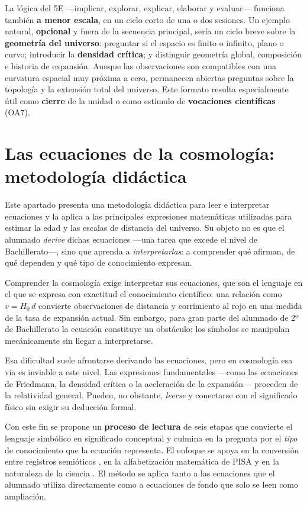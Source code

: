 La lógica del 5E ---implicar, explorar, explicar, elaborar y evaluar--- funciona también \textbf{a menor escala}, en un ciclo corto de una o dos sesiones. Un ejemplo natural, \textbf{opcional} y fuera de la secuencia principal, sería un ciclo breve sobre la \textbf{geometría del universo}: preguntar si el espacio es finito o infinito, plano o curvo; introducir la \textbf{densidad crítica}; y distinguir geometría global, composición e historia de expansión. Aunque las observaciones son compatibles con una curvatura espacial muy próxima a cero, permanecen abiertas preguntas sobre la topología y la extensión total del universo. Este formato resulta especialmente útil como \textbf{cierre} de la unidad o como estímulo de \textbf{vocaciones científicas} (OA7).

\section{Las ecuaciones de la cosmología: metodología didáctica}\label{sec:ecuaciones}

Este apartado presenta una metodología didáctica para leer e interpretar ecuaciones y la aplica a las principales expresiones matemáticas utilizadas para estimar la edad y las escalas de distancia del universo. Su objeto no es que el alumnado \emph{derive} dichas ecuaciones ---una tarea que excede el nivel de Bachillerato---, sino que aprenda a \emph{interpretarlas}: a comprender qué afirman, de qué dependen y qué tipo de conocimiento expresan.

Comprender la cosmología exige interpretar sus ecuaciones, que son el lenguaje en el que se expresa con exactitud el conocimiento científico: una relación como $v = H_{0}\,d$ convierte observaciones de distancia y corrimiento al rojo en una medida de la tasa de expansión actual. Sin embargo, para gran parte del alumnado de 2º de Bachillerato la ecuación constituye un obstáculo: los símbolos se manipulan mecánicamente sin llegar a interpretarse.

Esa dificultad suele afrontarse derivando las ecuaciones, pero en cosmología esa vía es inviable a este nivel. Las expresiones fundamentales ---como las ecuaciones de Friedmann, la densidad crítica o la aceleración de la expansión--- proceden de la relatividad general. Pueden, no obstante, \emph{leerse} y conectarse con el significado físico sin exigir su deducción formal.

Con este fin se propone un \textbf{proceso de lectura} de seis etapas que convierte el lenguaje simbólico en significado conceptual y culmina en la pregunta por el \emph{tipo} de conocimiento que la ecuación representa. El enfoque se apoya en la conversión entre registros semióticos \parencite{duval2006}, en la alfabetización matemática de PISA \parencite{oecd2019} y en la naturaleza de la ciencia \parencite{lederman1992}. El método se aplica tanto a las ecuaciones que el alumnado utiliza directamente como a ecuaciones de fondo que solo se leen como ampliación.

